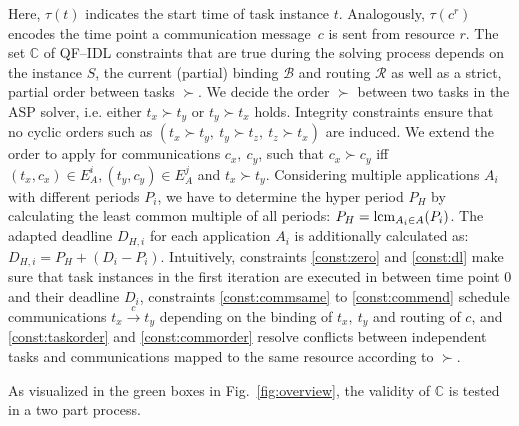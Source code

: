 Here, $\tau(t)$ indicates the start time of task instance $t$.
Analogously, $\tau(c^r)$ encodes the time point a communication message~$c$ is sent from resource $r$.
The set $\mathbb{C}$ of QF--IDL constraints that are true during the solving process depends 
on the instance $S$, the current (partial) binding $\mathcal{B}$ and routing $\mathcal{R}$
as well as a strict, partial order between tasks $\succ$.
We decide the order $\succ$ between two tasks in the ASP solver, i.e. either $t_x\succ t_y$ or $t_y\succ t_x$ holds. Integrity constraints ensure that no cyclic orders such as $(t_x\succ t_y,\ t_y\succ t_z,\ t_z\succ t_x)$ are induced.
We extend the order to apply for communications $c_x,\ c_y$, such that $c_x\succ c_y$ iff 
$(t_x,c_x)\in E^i_A,(t_y,c_y)\in E^j_A$ and $t_x\succ t_y$.
Considering multiple applications $A_i$ with different periods $P_i$, we have to determine the hyper period $P_H$ by calculating the least common multiple of all periods: $P_H=\operatorname{lcm}_{A_i\in A}(P_i)$. The adapted deadline $D_{H,i}$ for each application $A_i$ is additionally calculated as: $D_{H,i}=P_H+(D_i-P_i)$.
Intuitively, constraints \eqref{const:zero} and \eqref{const:dl} make sure that task instances in the first iteration are executed in between time point $0$ and their deadline $D_i$,
constraints \eqref{const:commsame} to \eqref{const:commend} schedule communications $t_x\xrightarrow{c} t_y$ depending on the binding of $t_x,\ t_y$ and routing of $c$,
and \eqref{const:taskorder} and \eqref{const:commorder} resolve conflicts between independent tasks and communications mapped to the same resource according to $\succ$.





As visualized in the green boxes in Fig.~\ref{fig:overview}, the validity of $\mathbb{C}$ is tested in a two part process.
